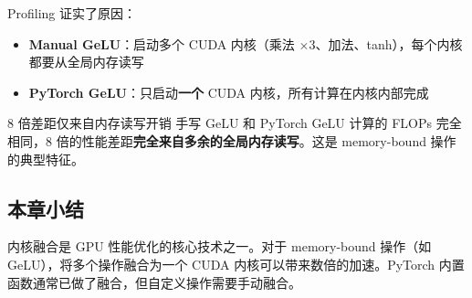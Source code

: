 Profiling 证实了原因：
\begin{itemize}
    \item \textbf{Manual GeLU}：启动多个 CUDA 内核（乘法 $\times 3$、加法、tanh），每个内核都要从全局内存读写
    \item \textbf{PyTorch GeLU}：只启动\textbf{一个} CUDA 内核，所有计算在内核内部完成
\end{itemize}

\begin{warningbox}{8 倍差距仅来自内存读写开销}
手写 GeLU 和 PyTorch GeLU 计算的 FLOPs 完全相同，8 倍的性能差距\textbf{完全来自多余的全局内存读写}。这是 memory-bound 操作的典型特征。
\end{warningbox}

\subsection{本章小结}

内核融合是 GPU 性能优化的核心技术之一。对于 memory-bound 操作（如 GeLU），将多个操作融合为一个 CUDA 内核可以带来数倍的加速。PyTorch 内置函数通常已做了融合，但自定义操作需要手动融合。



